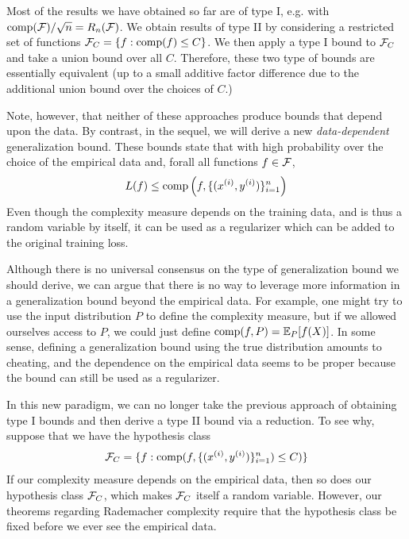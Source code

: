 \begin{remark}
    Most of the results we have obtained so far are of type I, e.g. with $\text{comp}(\cF)/\sqrt{n} = R_n(\cF)$. We obtain results of type II by considering a restricted set of functions $\cF_C = \{f : \text{comp}(f) \leq C\}$. We then apply a type I bound to $\cF_C$ and take a union bound over all $C$. Therefore, these two type of bounds are essentially equivalent (up to a small additive factor difference due to the additional union bound over the choices of $C$.)
\end{remark}

Note, however, that neither of these approaches produce bounds that depend upon the data. By contrast, in the sequel, we will derive a new \textit{data-dependent} generalization bound. These bounds state that with high probability over the choice of the empirical data and, forall all functions $f\in \cF$,
\begin{align}
    L(f) \leq \text{comp}\left (f, \{(x\sp{i}, y\sp{i})\}_{i = 1}^n\right)
\end{align}
Even though the complexity measure depends on the training data, and is thus a random variable by itself, it can be used as a regularizer which can be added to the original training loss.

\begin{remark}
Although there is no universal consensus on the type of generalization bound we should derive, we can argue that there is no way to leverage more information in a generalization bound beyond the empirical data. For example, one might try to use the input distribution $P$ to define the complexity measure, but if we allowed ourselves access to $P$, we could just define $\text{comp}(f, P) = \Exp_P[f(X)]$. In some sense, defining a generalization bound using the true distribution amounts to cheating, and the dependence on the empirical data seems to be proper because the bound can still be used as a regularizer. %
\end{remark}

In this new paradigm, we can no longer take the previous approach of obtaining type I bounds and then derive a type II bound via a reduction. To see why, suppose that we have the hypothesis class
\begin{align}
    \cF_C = \{f: \text{comp}(f, \{(x\sp{i}, y\sp{i})\}_{i=1}^n) \leq C)\}
\end{align}
If our complexity measure depends on the empirical data, then so does our hypothesis class $\cF_C$, which makes $\cF_C$ itself a random variable. However, our theorems regarding Rademacher complexity require that the hypothesis class be fixed before we ever see the empirical data.

